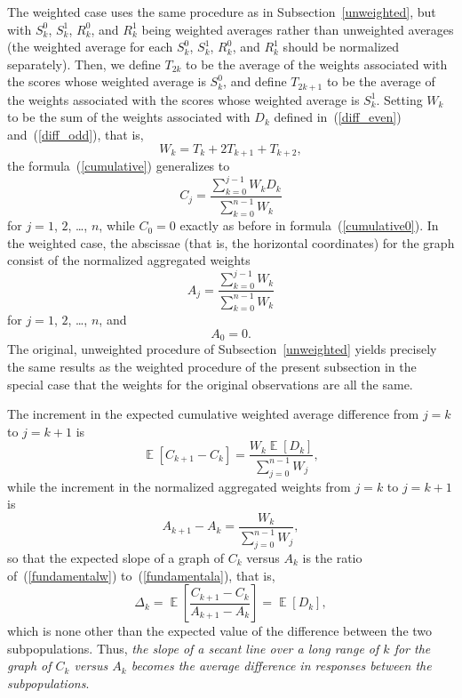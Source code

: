 \documentclass{article}
\DeclareMathOperator{\E}{\mathop{}\mathbb{E}}
\begin{document}
The weighted case uses the same procedure as in Subsection~\ref{unweighted},
but with $S^0_k$, $S^1_k$, $R^0_k$, and $R^1_k$ being weighted averages rather
than unweighted averages (the weighted average for each $S^0_k$, $S^1_k$,
$R^0_k$, and $R^1_k$ should be normalized separately).
Then, we define $T_{2k}$ to be the average of the weights associated
with the scores whose weighted average is $S^0_k$,
and define $T_{2k+1}$ to be the average of the weights associated
with the scores whose weighted average is $S^1_k$.
Setting $W_k$ to be the sum of the weights associated
with $D_k$ defined in~(\ref{diff_even}) and~(\ref{diff_odd}), that is,
%
\begin{equation}
\label{aggregatew}
W_k = T_k + 2T_{k+1} + T_{k+2},
\end{equation}
%
the formula~(\ref{cumulative}) generalizes to
%
\begin{equation}
\label{cumulativew}
C_j = \frac{\sum_{k=0}^{j-1} W_k D_k}{\sum_{k=0}^{n-1} W_k}
\end{equation}
%
for $j = 1$, $2$, \dots, $n$,
while $C_0 = 0$ exactly as before in formula~(\ref{cumulative0}).
In the weighted case, the abscissae (that is, the horizontal coordinates)
for the graph consist of the normalized aggregated weights
%
\begin{equation}
\label{abscissae}
A_j = \frac{\sum_{k=0}^{j-1} W_k}{\sum_{k=0}^{n-1} W_k}
\end{equation}
%
for $j = 1$, $2$, \dots, $n$, and
%
\begin{equation}
A_0 = 0.
\end{equation}
%
The original, unweighted procedure of Subsection~\ref{unweighted}
yields precisely the same results as the weighted procedure
of the present subsection in the special case that the weights
for the original observations are all the same.

The increment in the expected cumulative weighted average difference
from $j = k$ to $j = k+1$ is
%
\begin{equation}
\label{fundamentalw}
\E[ C_{k+1} - C_k ] = \frac{W_k \E[D_k]}{\sum_{j=0}^{n-1} W_j},
\end{equation}
%
while the increment in the normalized aggregated weights
from $j = k$ to $j = k+1$ is
%
\begin{equation}
\label{fundamentala}
A_{k+1} - A_k = \frac{W_k}{\sum_{j=0}^{n-1} W_j},
\end{equation}
%
so that the expected slope of a graph of $C_k$ versus $A_k$ is
the ratio of~(\ref{fundamentalw}) to~(\ref{fundamentala}), that is,
%
\begin{equation}
\label{deltaw}
\Delta_k = \E\left[\frac{C_{k+1} - C_k}{A_{k+1} - A_k}\right] = \E[D_k],
\end{equation}
%
which is none other than the expected value
of the difference between the two subpopulations.
Thus, {\it the slope of a secant line over a long range of $k$
for the graph of $C_k$ versus $A_k$ becomes the average difference
in responses between the subpopulations}.
\end{document}
